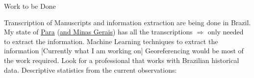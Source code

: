 \documentclass[aspectratio=1610]{beamer}
\begin{document}


\begin{frame}{Work to be Done}
    \label{work}
    \begin{outline}
        \1 Transcription of Manuscripts and information extraction are being done in Brazil.
            \vspace{1mm}
            \2 My state of \href{https://www.rosepepe.com.br/hotsite_acervo/sesmarias/}{Para} (\href{http://www.siaapm.cultura.mg.gov.br/modules/brtbusca/index.php?action=results&query=sesmarias&x=-722&y=-59}{and Minas Gerais}) has all the transcriptions $\Rightarrow$ only needed to extract the information.
            \vspace{0.5mm}
                \3 Machine Learning techniques to extract the information [Currently what I am working on]
                \vspace{0.5mm}
        \1 Georeferencing would be most of the work required.
            \vspace{1mm}
            \2 Look for a professional that works with Brazilian historical data.
        \1 Descriptive statistics from the current observations: 
        \\
        \hyperlink{contents}{}
        \hyperlink{year}{}
        \hyperlink{size}{}
    \end{outline}
\end{frame}
\end{document}
